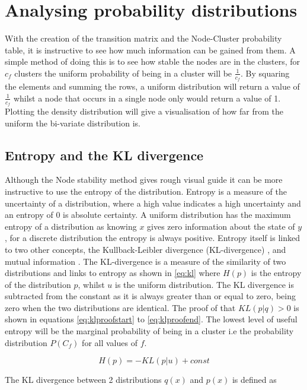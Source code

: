 \section{Analysing probability distributions}

With the creation of the transition matrix and the Node-Cluster probability table, it is instructive to see how much information can be gained from them. A simple method of doing this is to see how stable the nodes are in the clusters, for $c_f$ clusters the uniform probability of being in a cluster will be $\frac{1}{c_f}$. By squaring the elements and summing the rows, a uniform distribution will return a value of $\frac{1}{c_f}$ whilst a node that occurs in a single node only would return a value of 1. Plotting the density distribution will give a visualisation of how far from the uniform the bi-variate distribution is.

\subsection{Entropy and the KL divergence}
Although the Node stability method gives rough visual guide it can be more instructive to use the entropy of the distribution. Entropy is a measure of the uncertainty of a distribution, where a high value indicates a high uncertainty and an entropy of 0 is absolute certainty. A uniform distribution has the maximum entropy of a distribution as knowing $x$ gives zero information about the state of $y$, for a discrete distribution the entropy is always positive. Entropy itself is linked to two other concepts, the Kullback-Leibler divergence (KL-divergence) \cite{kullback1951} , and mutual information \cite{barber2012}. The KL-divergence is a measure of the similarity of two distributions and links to entropy as shown in \ref{eq:kl} where $H(p)$ is the entropy of the distribution $p$, whilst $u$ is the uniform distribution. The KL divergence is subtracted from the constant as it is always greater than or equal to zero, being zero when the two distributions are identical. The proof of that $KL(p|q)>0$ is shown in equations \ref{eq:klproofstart} to \ref{eq:klproofend}. The lowest level of useful entropy will be the marginal probability of being in a cluster i.e the probability distribution $P(C_f)$ for all values of $f$.

\begin{equation}
H(p)=-KL(p|u)+const
\label{eq:kl}
\end{equation}

 The KL divergence between 2 distributions $q(x)$ and $p(x)$ is defined as

